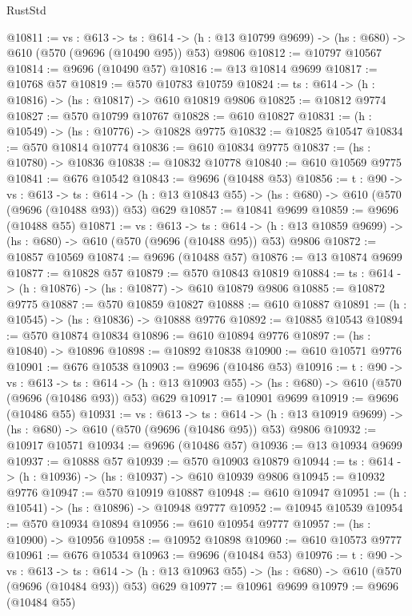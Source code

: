 \begin{lexlean}{RustStd}
\begin{coremodule}
@10811 := {vs : @613} ->
  {ts : @614} -> (h : @13 @10799 @9699) -> (hs : @680) -> @610 (@570 (@9696 (@10490 @95)) @53) @9806
@10812 := @10797 @10567
@10814 := @9696 (@10490 @57)
@10816 := @13 @10814 @9699
@10817 := @10768 @57
@10819 := @570 @10783 @10759
@10824 := {ts : @614} -> (h : @10816) -> (hs : @10817) -> @610 @10819 @9806
@10825 := @10812 @9774
@10827 := @570 @10799 @10767
@10828 := @610 @10827
@10831 := (h : @10549) -> (hs : @10776) -> @10828 @9775
@10832 := @10825 @10547
@10834 := @570 @10814 @10774
@10836 := @610 @10834 @9775
@10837 := (hs : @10780) -> @10836
@10838 := @10832 @10778
@10840 := @610 @10569 @9775
@10841 := @676 @10542
@10843 := @9696 (@10488 @53)
@10856 := {t : @90} ->
  {vs : @613} ->
  {ts : @614} -> (h : @13 @10843 @55) -> (hs : @680) -> @610 (@570 (@9696 (@10488 @93)) @53) @629
@10857 := @10841 @9699
@10859 := @9696 (@10488 @55)
@10871 := {vs : @613} ->
  {ts : @614} -> (h : @13 @10859 @9699) -> (hs : @680) -> @610 (@570 (@9696 (@10488 @95)) @53) @9806
@10872 := @10857 @10569
@10874 := @9696 (@10488 @57)
@10876 := @13 @10874 @9699
@10877 := @10828 @57
@10879 := @570 @10843 @10819
@10884 := {ts : @614} -> (h : @10876) -> (hs : @10877) -> @610 @10879 @9806
@10885 := @10872 @9775
@10887 := @570 @10859 @10827
@10888 := @610 @10887
@10891 := (h : @10545) -> (hs : @10836) -> @10888 @9776
@10892 := @10885 @10543
@10894 := @570 @10874 @10834
@10896 := @610 @10894 @9776
@10897 := (hs : @10840) -> @10896
@10898 := @10892 @10838
@10900 := @610 @10571 @9776
@10901 := @676 @10538
@10903 := @9696 (@10486 @53)
@10916 := {t : @90} ->
  {vs : @613} ->
  {ts : @614} -> (h : @13 @10903 @55) -> (hs : @680) -> @610 (@570 (@9696 (@10486 @93)) @53) @629
@10917 := @10901 @9699
@10919 := @9696 (@10486 @55)
@10931 := {vs : @613} ->
  {ts : @614} -> (h : @13 @10919 @9699) -> (hs : @680) -> @610 (@570 (@9696 (@10486 @95)) @53) @9806
@10932 := @10917 @10571
@10934 := @9696 (@10486 @57)
@10936 := @13 @10934 @9699
@10937 := @10888 @57
@10939 := @570 @10903 @10879
@10944 := {ts : @614} -> (h : @10936) -> (hs : @10937) -> @610 @10939 @9806
@10945 := @10932 @9776
@10947 := @570 @10919 @10887
@10948 := @610 @10947
@10951 := (h : @10541) -> (hs : @10896) -> @10948 @9777
@10952 := @10945 @10539
@10954 := @570 @10934 @10894
@10956 := @610 @10954 @9777
@10957 := (hs : @10900) -> @10956
@10958 := @10952 @10898
@10960 := @610 @10573 @9777
@10961 := @676 @10534
@10963 := @9696 (@10484 @53)
@10976 := {t : @90} ->
  {vs : @613} ->
  {ts : @614} -> (h : @13 @10963 @55) -> (hs : @680) -> @610 (@570 (@9696 (@10484 @93)) @53) @629
@10977 := @10961 @9699
@10979 := @9696 (@10484 @55)

\end{coremodule}
\end{lexlean}
